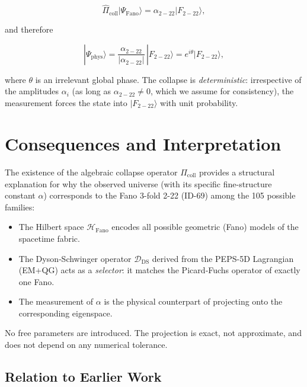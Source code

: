 \documentclass[12pt]{article}
\begin{document}
\[
\hat{\Pi}_{\text{coll}} |\Psi_{\text{Fano}}\rangle = \alpha_{2-22} |F_{2-22}\rangle,
\]

and therefore

\begin{equation}
|\Psi_{\text{phys}}\rangle = \frac{\alpha_{2-22}}{|\alpha_{2-22}|}
\, |F_{2-22}\rangle = e^{i\theta} |F_{2-22}\rangle,
\label{eq:final_collapse}
\end{equation}

where \(\theta\) is an irrelevant global phase. The collapse is
\emph{deterministic}: irrespective of the amplitudes \(\alpha_i\) (as long as
\(\alpha_{2-22}\neq 0\), which we assume for consistency), the measurement
forces the state into \(|F_{2-22}\rangle\) with unit probability.

\section{Consequences and Interpretation}

The existence of the algebraic collapse operator \(\hat{\Pi}_{\text{coll}}\)
provides a structural explanation for why the observed universe (with its
specific fine-structure constant \(\alpha\)) corresponds to the Fano 3-fold
2-22 (ID-69) among the 105 possible families:

\begin{itemize}
  \item The Hilbert space \(\mathcal{H}_{\text{Fano}}\) encodes all possible
        geometric (Fano) models of the spacetime fabric.
  \item The Dyson‑Schwinger operator \(\mathcal{D}_{\text{DS}}\) derived from
        the PEPS-5D Lagrangian (EM+QG) acts as a \emph{selector}: it matches
        the Picard‑Fuchs operator of exactly one Fano.
  \item The measurement of \(\alpha\) is the physical counterpart of
        projecting onto the corresponding eigenspace.
\end{itemize}

No free parameters are introduced. The projection is exact, not approximate,
and does not depend on any numerical tolerance.

\subsection*{Relation to Earlier Work}
\end{document}

